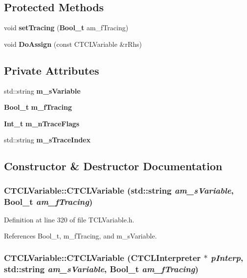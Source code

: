 \subsection*{Protected Methods}
\begin{CompactItemize}
\item 
void {\bf set\-Tracing} ({\bf Bool\_\-t} am\_\-f\-Tracing)
\item 
void {\bf Do\-Assign} (const CTCLVariable \&r\-Rhs)
\end{CompactItemize}
\subsection*{Private Attributes}
\begin{CompactItemize}
\item 
std::string {\bf m\_\-s\-Variable}
\item 
{\bf Bool\_\-t} {\bf m\_\-f\-Tracing}
\item 
{\bf Int\_\-t} {\bf m\_\-n\-Trace\-Flags}
\item 
std::string {\bf m\_\-s\-Trace\-Index}
\end{CompactItemize}


\subsection{Constructor \& Destructor Documentation}
\subsubsection{\setlength{\rightskip}{0pt plus 5cm}CTCLVariable::CTCLVariable (std::string {\em am\_\-s\-Variable}, {\bf Bool\_\-t} {\em am\_\-f\-Tracing})\hspace{0.3cm}{\tt  [inline]}}\label{classCTCLVariable_a0}




Definition at line 320 of file TCLVariable.h.

References Bool\_\-t, m\_\-f\-Tracing, and m\_\-s\-Variable.
\subsubsection{\setlength{\rightskip}{0pt plus 5cm}CTCLVariable::CTCLVariable ({\bf CTCLInterpreter} $\ast$ {\em p\-Interp}, std::string {\em am\_\-s\-Variable}, {\bf Bool\_\-t} {\em am\_\-f\-Tracing})\hspace{0.3cm}{\tt  [inline]}}\label{classCTCLVariable_a1}




